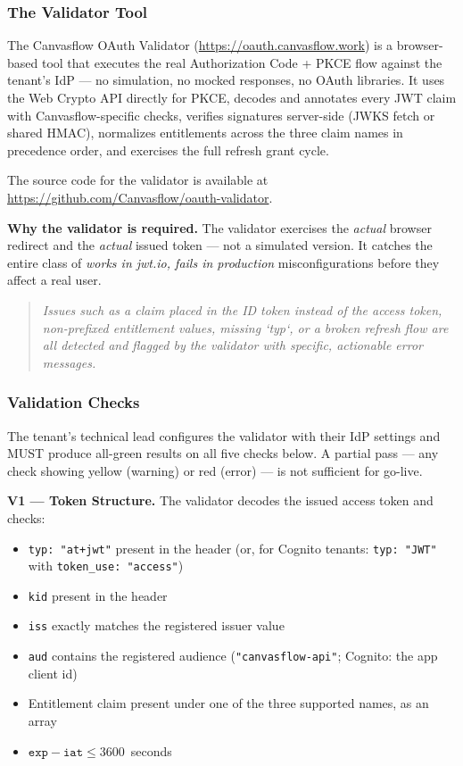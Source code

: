 \subsubsection{The Validator Tool}

The Canvasflow OAuth Validator (\url{https://oauth.canvasflow.work}) is a browser-based
tool that executes the real Authorization Code + PKCE flow against the tenant's IdP ---
no simulation, no mocked responses, no OAuth libraries. It uses the Web Crypto API
directly for PKCE, decodes and annotates every JWT claim with Canvasflow-specific
checks, verifies signatures server-side (JWKS fetch or shared
HMAC), normalizes entitlements across the three claim names in precedence order, and
exercises the full refresh grant cycle.

The source code for the validator is available at
\url{https://github.com/Canvasflow/oauth-validator}.

\textbf{Why the validator is required.} The validator exercises the \emph{actual}
browser redirect and the \emph{actual} issued token --- not a simulated version. It
catches the entire class of \textit{works in jwt.io, fails in production} misconfigurations
before they affect a real user.

\begin{quote}
  \textit{Issues such as a claim placed in the ID token instead of the access token, 
  non-prefixed entitlement values, missing `typ`, or a broken refresh flow are 
  all detected and flagged by the validator with specific, 
  actionable error messages.}
\end{quote}

\subsubsection{Validation Checks}

The tenant's technical lead configures the validator with their IdP settings and MUST
produce all-green results on all five checks below. A partial pass --- any check showing
yellow (warning) or red (error) --- is not sufficient for go-live.

\textbf{V1 --- Token Structure.} The validator decodes the issued access token and
checks:
\begin{itemize}
  \item \texttt{typ: "at+jwt"} present in the header (or, for Cognito tenants:
    \texttt{typ: "JWT"} with \texttt{token\_use: "access"})
  \item \texttt{kid} present in the header
  \item \texttt{iss} exactly matches the registered issuer value
  \item \texttt{aud} contains the registered audience (\texttt{"canvasflow-api"}; Cognito: the app client id)
  \item Entitlement claim present under one of the three supported names, as an array
  \item $\texttt{exp} - \texttt{iat} \leq 3600$~seconds
\end{itemize}

